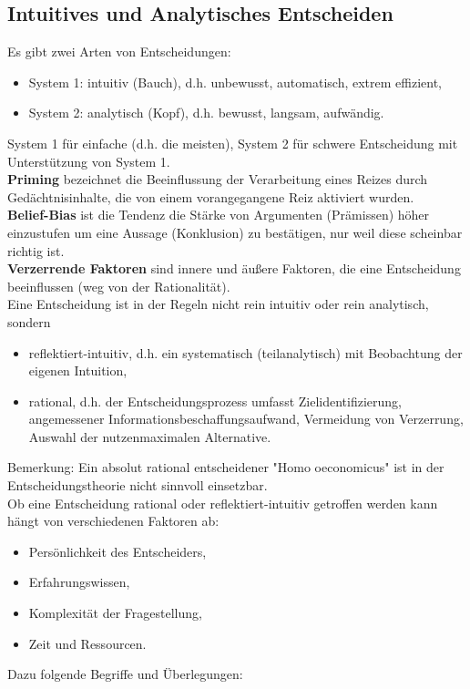 \subsection{Intuitives und Analytisches Entscheiden}
Es gibt zwei Arten von Entscheidungen:
\begin{itemize}
	\item System 1: intuitiv (Bauch), d.h. unbewusst, automatisch, extrem effizient,
	\item System 2: analytisch (Kopf), d.h. bewusst, langsam, aufwändig.
\end{itemize}
System 1 für einfache (d.h. die meisten), System 2 für schwere Entscheidung mit Unterstützung von System 1.\\
\textbf{Priming} bezeichnet die Beeinflussung der Verarbeitung eines Reizes durch Gedächtnisinhalte, die von einem vorangegangene Reiz aktiviert wurden.\\
\textbf{Belief-Bias} ist die Tendenz die Stärke von Argumenten (Prämissen) höher einzustufen um eine Aussage (Konklusion) zu bestätigen, nur weil diese scheinbar richtig ist.\\
\textbf{Verzerrende Faktoren} sind innere und äußere Faktoren, die eine Entscheidung beeinflussen (weg von der Rationalität).
\ \\
Eine Entscheidung ist in der Regeln nicht rein intuitiv oder rein analytisch, sondern
\begin{itemize}
	\item reflektiert-intuitiv, d.h. ein systematisch (teilanalytisch) mit Beobachtung der eigenen Intuition,
	\item rational, d.h. der Entscheidungsprozess umfasst Zielidentifizierung, angemessener Informationsbeschaffungsaufwand, Vermeidung von Verzerrung, Auswahl der nutzenmaximalen Alternative.
\end{itemize}
Bemerkung: Ein absolut rational entscheidener "Homo oeconomicus" ist in der Entscheidungstheorie nicht sinnvoll einsetzbar.\\
Ob eine Entscheidung rational oder reflektiert-intuitiv getroffen werden kann hängt von verschiedenen Faktoren ab:
\begin{itemize}
	\item Persönlichkeit des Entscheiders,
	\item Erfahrungswissen,
	\item Komplexität der Fragestellung,
	\item Zeit und Ressourcen.
\end{itemize}
Dazu folgende Begriffe und Überlegungen:\\
